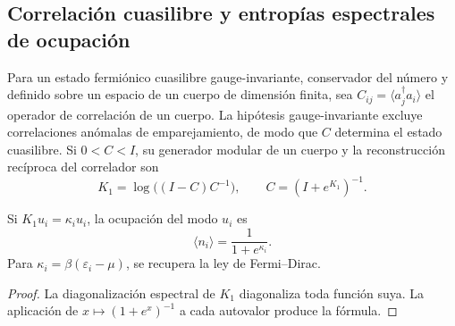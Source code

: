 \subsection{Correlación cuasilibre y entropías espectrales de ocupación}
\label{v:rec:cuasilibre:section:01}

Para un estado fermiónico cuasilibre gauge-invariante, conservador del
número y definido sobre un espacio de un cuerpo de dimensión finita, sea
\(C_{ij}=\langle a_j^\dagger a_i\rangle\) el operador de correlación de un
cuerpo. La hipótesis gauge-invariante excluye correlaciones anómalas de
emparejamiento, de modo que \(C\) determina el estado cuasilibre. Si
\(0<C<I\), su generador modular de un cuerpo y la reconstrucción recíproca
del correlador son
\begin{equation}
 \boxed{
 K_1=\log\bigl((I-C)C^{-1}\bigr),
 \qquad
 C=(I+e^{K_1})^{-1}.}
 \label{v:rec:eq:puente-cuasilibre-modular-rev3}
\end{equation}

\begin{corollary}
\label{v:rec:cor:forma-logistica-modular-rev3}
Si \(K_1u_i=\kappa_i u_i\), la ocupación del modo \(u_i\) es
\[
 \langle n_i\rangle=\frac1{1+e^{\kappa_i}}.
\]
Para \(\kappa_i=\beta(\varepsilon_i-\mu)\), se recupera la ley de
Fermi--Dirac.
\end{corollary}

\begin{proof}
La diagonalización espectral de \(K_1\) diagonaliza toda función suya. La
aplicación de \(x\mapsto(1+e^x)^{-1}\) a cada autovalor produce la fórmula.
\end{proof}

